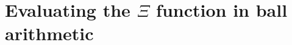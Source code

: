 \chapter{Evaluating the \texorpdfstring{$\Xi$}{Xi} function in ball arithmetic}\label{vol2:ch2}





